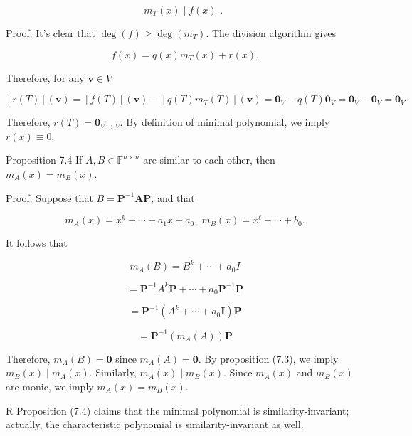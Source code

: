 \documentclass[11pt]{article}
\begin{document}
\[
{m}_{T}\left( x\right)  \mid  f\left( x\right) \text{ . }
\]

Proof. It’s clear that \(\deg \left( f\right)  \geq  \deg \left( {m}_{T}\right)\). The division algorithm gives

\[
f\left( x\right)  = q\left( x\right) {m}_{T}\left( x\right)  + r\left( x\right) .
\]

Therefore, for any \(\mathbf{v} \in  V\)

\[
\left\lbrack  {r\left( T\right) }\right\rbrack  \left( \mathbf{v}\right)  = \left\lbrack  {f\left( T\right) }\right\rbrack  \left( \mathbf{v}\right)  - \left\lbrack  {q\left( T\right) {m}_{T}\left( T\right) }\right\rbrack  \left( \mathbf{v}\right)  = {\mathbf{0}}_{V} - q\left( T\right) {\mathbf{0}}_{V} = {\mathbf{0}}_{V} - {\mathbf{0}}_{V} = {\mathbf{0}}_{V}
\]

Therefore, \(r\left( T\right)  = {\mathbf{0}}_{V \rightarrow  V}\). By definition of minimal polynomial, we imply \(r\left( x\right)  \equiv  0\).

Proposition 7.4 If \(A,B \in  {\mathbb{F}}^{n \times  n}\) are similar to each other, then \({m}_{A}\left( x\right)  = {m}_{B}\left( x\right)\).

Proof. Suppose that \(B = {\mathbf{P}}^{-1}\mathbf{{AP}}\), and that

\[
{m}_{A}\left( x\right)  = {x}^{k} + \cdots  + {a}_1x + {a}_{0},\;{m}_{B}\left( x\right)  = {x}^{\ell } + \cdots  + {b}_{0}.
\]

It follows that

\[
{m}_{A}\left( B\right)  = {B}^{k} + \cdots  + {a}_{0}I
\]

\[
= {\mathbf{P}}^{-1}{A}^{k}\mathbf{P} + \cdots  + {a}_{0}{\mathbf{P}}^{-1}\mathbf{P}
\]

\[
= {\mathbf{P}}^{-1}\left( {{A}^{k} + \cdots  + {a}_{0}\mathbf{I}}\right) \mathbf{P}
\]

\[
= {\mathbf{P}}^{-1}\left( {{m}_{A}\left( A\right) }\right) \mathbf{P}
\]

Therefore, \({m}_{A}\left( B\right)  = \mathbf{0}\) since \({m}_{A}\left( A\right)  = \mathbf{0}\). By proposition (7.3), we imply \({m}_{B}\left( x\right)  \mid  {m}_{A}\left( x\right)\). Similarly, \({m}_{A}\left( x\right)  \mid  {m}_{B}\left( x\right)\). Since \({m}_{A}\left( x\right)\) and \({m}_{B}\left( x\right)\) are monic, we imply \({m}_{A}\left( x\right)  = {m}_{B}\left( x\right)\).

R Proposition (7.4) claims that the minimal polynomial is similarity-invariant; actually, the characteristic polynomial is similarity-invariant as well.
\end{document}
